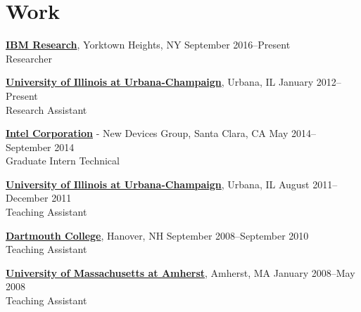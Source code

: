 
\section{\sc Work}
{\href{http://www.research.ibm.com/}{{\bf IBM Research}}}, Yorktown Heights, NY \hfill September 2016--Present\\
Researcher
\vspace{-0.16cm}

{\href{http://www.illinois.edu/}{{\bf University of Illinois at Urbana-Champaign}}}, Urbana, IL \hfill January 2012--Present\\
Research Assistant
\vspace{-0.16cm}

{\href{http://www.intel.com/}{{\bf Intel Corporation}}} - New Devices Group, Santa Clara, CA \hfill May 2014--September 2014\\
Graduate Intern Technical
\vspace{-0.16cm}

{\href{http://www.illinois.edu/}{{\bf University of Illinois at Urbana-Champaign}}}, Urbana, IL \hfill August 2011--December 2011\\
Teaching Assistant
\vspace{-0.16cm}

{\href{http://www.dartmouth.edu/}{{\bf Dartmouth College}}}, Hanover, NH \hfill September 2008--September 2010\\
Teaching Assistant
\vspace{-0.16cm}

{\href{http://www.umass.edu/}{{\bf University of Massachusetts at Amherst}}}, Amherst, MA \hfill January 2008--May 2008\\
Teaching Assistant

